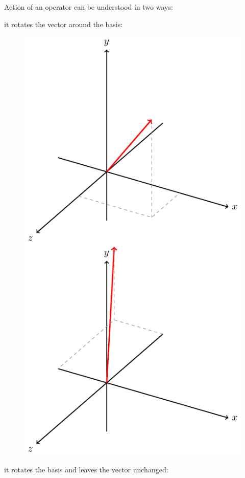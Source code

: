 Action of an operator can be understood in two ways:
\begin{legal}
    \item it rotates the vector around the basis:
    \begin{figure}[ht]
        \centering
        \begin{minipage}{.5\textwidth}
          \centering
          \includegraphics[width=.6\linewidth]{original_vector}
        \end{minipage}%
        \begin{minipage}{.5\textwidth}
          \centering
          \includegraphics[width=.6\linewidth]{rotated_vector}
        \end{minipage}
    \end{figure}
    \item it rotates the basis and leaves the vector unchanged:
    \begin{figure}[ht]
        \centering
        \begin{minipage}{.5\textwidth}

\end{minipage}
\end{figure}
\end{legal}
